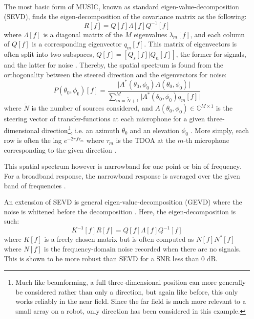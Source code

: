 \documentclass{report}
\begin{document}
The most basic form of MUSIC, known as standard eigen-value-decomposition (SEVD), finds the eigen-decomposition of the covariance matrix as the following:
\begin{equation}
R[f] = Q[f]\Lambda[f]Q^{-1}[f]
\end{equation}
where $\Lambda[f]$ is a diagonal matrix of the $M$ eigenvalues $\lambda_m[f]$, and each column of $Q[f]$ is a corresponding eigenvector $q_m[f]$. This matrix of eigenvectors is often split into two subspaces, $Q[f] = [Q_s[f]|Q_n[f]]$, the former for signals, and the latter for noise \cite{rascon_localization_2017}. Thereby, the spatial spectrum is found from the orthogonality between the steered direction and the eigenvectors for noise:
\begin{equation}
P(\theta_0, \phi_0)[f] = \frac{\lvert A^*(\theta_0, \phi_0) A(\theta_0, \phi_0) \rvert}
	{\sum_{m=\tilde{N}+1}^M \lvert A^*(\theta_0, \phi_0) q_m[f] \rvert}
\end{equation}
where $\tilde{N}$ is the number of sources considered, and $A(\theta_0, \phi_0)\in \mathbb{C}^{M\times 1}$ is the steering vector of transfer-functions at each microphone for a given three-dimensional direction\footnote{Much like beamforming, a full three-dimensional position can more generally be considered rather than only a direction, but again like before, this only works reliably in the near field. Since the far field is much more relevant to a small array on a robot, only direction has been considered in this example.}, i.e. an azimuth $\theta_0$ and an elevation $\phi_0$ \cite{nakamura_real-time_2012}. More simply, each row is often the lag $e^{-2\pi f\tau_m}$ where $\tau_m$ is the TDOA at the $m$-th microphone corresponding to the given direction \cite{rascon_localization_2017}.

This spatial spectrum however is narrowband for one point or bin of frequency. For a broadband response, the narrowband response is averaged over the given band of frequencies \cite{ishi_effects_2011} \cite{nakamura_real-time_2012}.

An extension of SEVD is general eigen-value-decomposition (GEVD) where the noise is whitened before the decomposition \cite{nakamura_intelligent_2009} \cite{nakamura_intelligent_2011} \cite{nakamura_real-time_2012}. Here, the eigen-decomposition is such:
\begin{equation}
K^{-1}[f] R[f] = Q[f] \Lambda[f] Q^{-1}[f]
\end{equation}
where $K[f]$ is a freely chosen matrix but is often computed as $N[f]N^*[f]$ where $N[f]$ is the frequency-domain noise recorded when there are no signals. This is shown to be more robust than SEVD for a SNR less than 0 \si{dB}.
\end{document}
